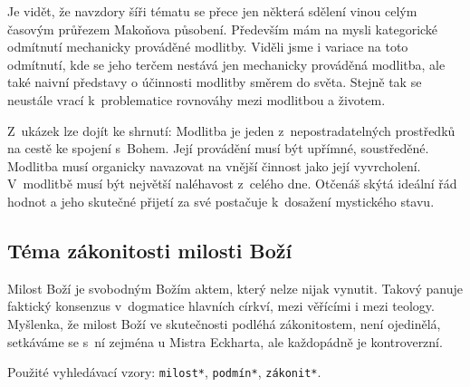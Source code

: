 Je vidět, že navzdory šíři tématu se přece jen některá sdělení vinou celým
časovým průřezem Makoňova působení. Především mám na mysli kategorické odmítnutí
mechanicky prováděné modlitby. Viděli jsme i variace na toto odmítnutí, kde se
jeho terčem nestává jen mechanicky prováděná modlitba, ale také naivní představy
o účinnosti modlitby směrem do světa. Stejně tak se neustále vrací k~problematice
rovnováhy mezi modlitbou a životem.

Z~ukázek lze dojít ke shrnutí: Modlitba je jeden z~nepostradatelných prostředků
na cestě ke spojení s~Bohem. Její provádění musí být upřímné, soustředěné.
Modlitba musí organicky navazovat na vnější činnost jako její vyvrcholení.
V~modlitbě musí být největší naléhavost z~celého dne. Otčenáš skýtá ideální řád
hodnot a jeho skutečné přijetí za své postačuje k~dosažení mystického stavu.

\subsection{Téma zákonitosti milosti Boží}

Milost Boží je svobodným Božím aktem, který nelze nijak vynutit. Takový panuje
faktický konsenzus v~dogmatice hlavních církví, mezi věřícími i mezi teology.
Myšlenka, že milost Boží ve skutečnosti podléhá zákonitostem, není ojedinělá,
setkáváme se s~ní zejména u Mistra Eckharta, ale každopádně je kontroverzní.

Použité vyhledávací vzory:
\texttt{milost*},
\texttt{podmín*},
\texttt{zákonit*}.


